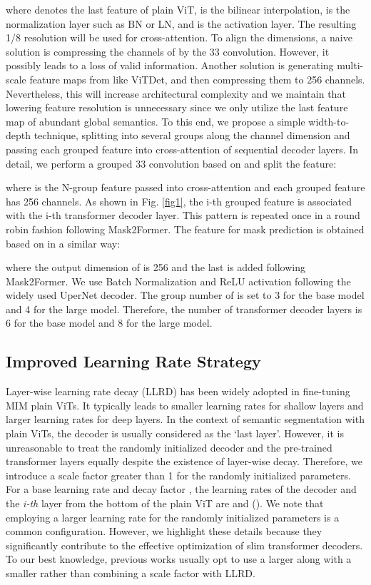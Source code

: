 \documentclass{article} \usepackage{iclr2024_conference,times}
\begin{document}
where  denotes the last feature of plain ViT,  is the bilinear interpolation,  is the normalization layer such as BN or LN, and  is the activation layer.
The resulting 1/8 resolution  will be used for cross-attention. To align the dimensions, a naive solution is compressing the channels of  by the 33 convolution. However, it possibly leads to a loss of valid information. Another solution is generating multi-scale feature maps from  like ViTDet, and then compressing them to 256 channels. Nevertheless, this will increase architectural complexity and we maintain that lowering feature resolution is unnecessary since we only utilize the last feature map of abundant global semantics. To this end, we propose a simple width-to-depth technique, splitting  into several groups along the channel dimension and passing each grouped feature into cross-attention of sequential decoder layers. In detail, we perform a grouped 33 convolution based on  and split the feature:

where  is the N-group feature passed into cross-attention and each grouped feature has 256 channels. As shown in Fig. \ref{fig1}, the i-th grouped feature is associated with the i-th transformer decoder layer. This pattern is repeated once in a round robin fashion following Mask2Former. The feature for mask prediction is obtained based on  in a similar way:

where the output dimension of  is 256 and the last  is added following Mask2Former. We use Batch Normalization and ReLU activation following the widely used UperNet decoder. The group number of  is set to 3 for the base model and 4 for the large model. Therefore, the number of transformer decoder layers is 6 for the base model and 8 for the large model.

\subsection{Improved Learning Rate Strategy}

Layer-wise learning rate decay (LLRD) has been widely adopted in fine-tuning MIM plain ViTs. It typically leads to smaller learning rates for shallow layers and larger learning rates for deep layers. In the context of semantic segmentation with plain ViTs, the decoder is usually considered as the `last layer'. However, it is unreasonable to treat the randomly initialized decoder and the pre-trained transformer layers equally despite the existence of layer-wise decay. Therefore, we introduce a scale factor  greater than 1 for the randomly initialized parameters. For a base learning rate  and decay factor , the learning rates of the decoder and the \textit{i-th} layer from the bottom of the plain ViT are  and  (). We note that employing a larger learning rate for the randomly initialized parameters is a common configuration. However, we highlight these details because they significantly contribute to the effective optimization of slim transformer decoders. To our best knowledge, previous works usually opt to use a larger  along with a smaller  rather than combining a scale factor with LLRD.
\end{document}
